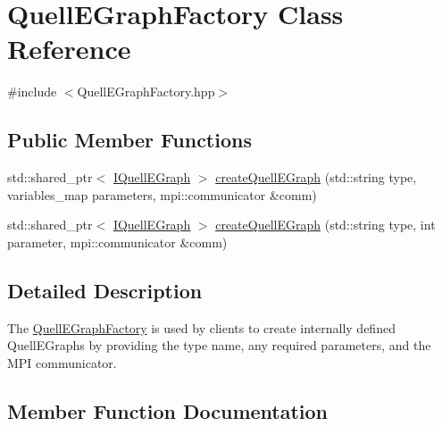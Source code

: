 \hypertarget{a00101}{}\section{Quell\+E\+Graph\+Factory Class Reference}
\label{a00101}


{\ttfamily \#include $<$Quell\+E\+Graph\+Factory.\+hpp$>$}

\subsection*{Public Member Functions}
\begin{DoxyCompactItemize}
\item 
std\+::shared\+\_\+ptr$<$ \hyperlink{a00076}{I\+Quell\+E\+Graph} $>$ \hyperlink{a00101_a224ef56cb020e11a9bd1ad3faec5f606}{create\+Quell\+E\+Graph} (std\+::string type, variables\+\_\+map parameters, mpi\+::communicator \&comm)
\item 
std\+::shared\+\_\+ptr$<$ \hyperlink{a00076}{I\+Quell\+E\+Graph} $>$ \hyperlink{a00101_a528e7317d26bf71f4888f23e09fe7812}{create\+Quell\+E\+Graph} (std\+::string type, int parameter, mpi\+::communicator \&comm)
\end{DoxyCompactItemize}


\subsection{Detailed Description}
The \hyperlink{a00101}{Quell\+E\+Graph\+Factory} is used by clients to create internally defined Quell\+E\+Graphs by providing the type name, any required parameters, and the M\+PI communicator. 

\subsection{Member Function Documentation}
